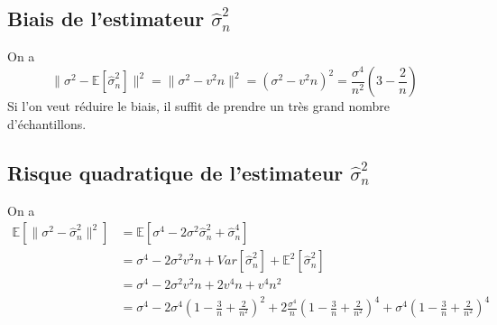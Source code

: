\documentclass{report}
\begin{document}
		\subsection{Biais de l'estimateur $\hat\sigma^2_n$}
            On a 
            \[ \lVert\sigma^2 - \mathbb{E}[\hat\sigma^2_n]\rVert^2 = \lVert \sigma^2 - v^2n \rVert^2 = (\sigma^2 - v^2n)^2 = \frac{\sigma^4}{n^2}(3-\frac{2}{n}) \]
            Si l'on veut réduire le biais, il suffit de prendre un très grand nombre d'échantillons.
		\subsection{Risque quadratique de l'estimateur $\hat\sigma^2_n$}
			On a
			\begin{align*}
				\mathbb{E}[ \lVert\sigma^2 - \hat\sigma^2_n\rVert^2 ] &= \mathbb{E}[\sigma^4 - 2\sigma^2\hat\sigma^2_n + \hat\sigma^4_n] \\
				&= \sigma^4 - 2\sigma^2v^2n + Var[\hat\sigma^2_n]+\mathbb{E}^2[\hat\sigma^2_n]\\
				&= \sigma^4 - 2\sigma^2v^2n + 2v^4n + v^4n^2\\
				&= \sigma^4 - 2\sigma^4(1-\frac{3}{n}+\frac{2}{n^2})^2 + 2\frac{\sigma^4}{n}(1-\frac{3}{n}+\frac{2}{n^2})^4 + \sigma^4(1-\frac{3}{n}+\frac{2}{n^2})^4
			\end{align*}
\end{document}
